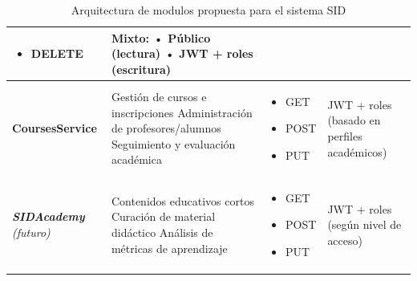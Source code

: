 \documentclass[11pt,a4paper]{article}
\newcommand{\future}[1]{\textit{#1}}
\begin{document}
\begin{table}[H]
\begin{tabular}{>{\raggedright\arraybackslash}p{2.8cm} >{\raggedright\arraybackslash}p{5.0cm} >{\raggedright\arraybackslash}p{3.0cm} >{\raggedright\arraybackslash}p{3.0cm}}
\begin{itemize}[nosep,leftmargin=*]
            \item DELETE
        \end{itemize} &
        Mixto:\newline
        • Público (lectura)\newline
        • JWT + roles (escritura) \\
        \midrule
        \rowcolor{rowcolor1}
        \textbf{CoursesService} & 
        Gestión de cursos e inscripciones\newline
        Administración de profesores/alumnos\newline
        Seguimiento y evaluación académica &
        \begin{itemize}[nosep,leftmargin=*]
            \item GET
            \item POST
            \item PUT
        \end{itemize} &
        JWT + roles\newline
        (basado en perfiles académicos) \\
        \midrule
        \rowcolor{rowcolor2}
        \textbf{\future{SIDAcademy}}\newline
        \textit{(futuro)} & 
        Contenidos educativos cortos\newline
        Curación de material didáctico\newline
        Análisis de métricas de aprendizaje &
        \begin{itemize}[nosep,leftmargin=*]
            \item GET
            \item POST
            \item PUT
        \end{itemize} &
        JWT + roles\newline
        (según nivel de acceso) \\
        \bottomrule
    \end{tabular}
    \caption{Arquitectura de modulos propuesta para el sistema SID}
\end{table}
\end{document}
